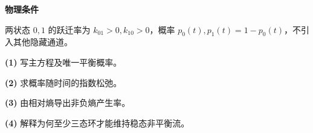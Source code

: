 \textbf{物理条件}\par 两状态 \(0,1\) 的跃迁率为 \(k_{01}>0,k_{10}>0\)，概率 \(p_0(t),p_1(t)=1-p_0(t)\)，不引入其他隐藏通道。
\par\noindent\textbf{(1)} 写主方程及唯一平衡概率。
\par\noindent\textbf{(2)} 求概率随时间的指数松弛。
\par\noindent\textbf{(3)} 由相对熵导出非负熵产生率。
\par\noindent\textbf{(4)} 解释为何至少三态环才能维持稳态非平衡流。
